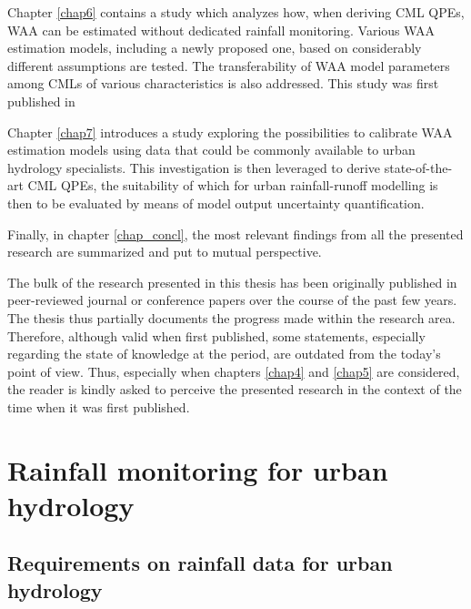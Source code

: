 \documentclass{ctuthesis}\usepackage[]{graphicx}\usepackage[]{color}
\begin{document}
Chapter \ref{chap6} contains a study which analyzes how, when deriving CML QPEs, WAA can be estimated without dedicated rainfall monitoring. Various WAA estimation models, including a newly proposed one, based on considerably different assumptions are tested. The transferability of WAA model parameters among CMLs of various characteristics is also addressed. This study was first published in \cite{pastorekPrecipitationEstimatesCommercial2022}

Chapter \ref{chap7} introduces a study exploring the possibilities to calibrate WAA estimation models using data that could be commonly available to urban hydrology specialists. This investigation is then leveraged to derive state-of-the-art CML QPEs, the suitability of which for urban rainfall-runoff modelling is then to be evaluated by means of model output uncertainty quantification.

Finally, in chapter \ref{chap_concl}, the most relevant findings from all the presented research are summarized and put to mutual perspective.

\enlargethispage{\baselineskip}

The bulk of the research presented in this thesis has been originally published in peer-reviewed journal or conference papers over the course of the past few years. The thesis thus partially documents the progress made within the research area. Therefore, although valid when first published, some statements, especially regarding the state of knowledge at the period, are outdated from the today's point of view. Thus, especially when chapters \ref{chap4} and \ref{chap5} are considered, the reader is kindly asked to perceive the presented research in the context of the time when it was first published.



        


\chapter{Rainfall monitoring for urban hydrology} \label{chap2}


\section{Requirements on rainfall data for urban hydrology}
\end{document}
